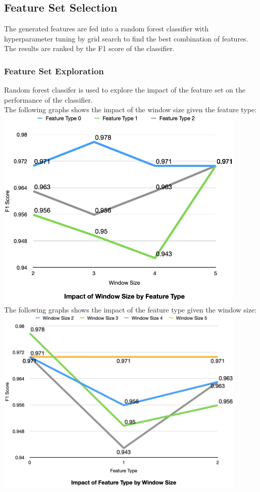 \documentclass{article}
\begin{document}
    \subsection{Feature Set Selection}
    The generated features are fed into a random forest classifier with hyperparameter tuning by grid search to find the best combination of features.
    The results are ranked by the F1 score of the classifier. 
    \subsubsection{Feature Set Exploration}
    Random forest classifer is used to explore the impact of the feature set on the performance of the classifier.\\
    The following graphs shows the impact of the window size given the feature type:\\
    \includegraphics[width=12cm]{./by_feature.png}\\
    The following graphs shows the impact of the feature type given the window size:\\
    \includegraphics[width=12cm]{./by_window_size.png}\\
\end{document}
